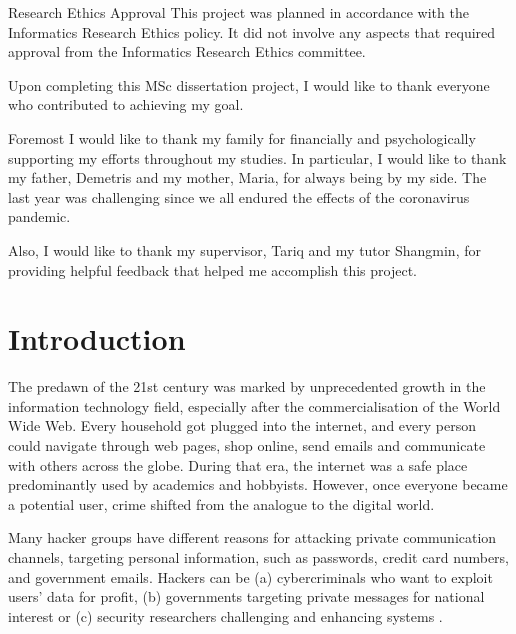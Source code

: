 \documentclass[logo,msc,cyber]{infthesis}   %
\begin{document}
\begin{preliminary}
\newenvironment{ethics}
   {\begin{frontenv}{Research Ethics Approval}{\LARGE}}
   {\end{frontenv}\newpage}

\begin{ethics}
This project was planned in accordance with the Informatics Research
Ethics policy. It did not involve any aspects that required approval
from the Informatics Research Ethics committee.

\standarddeclaration
\end{ethics}


\begin{acknowledgements}
    Upon completing this MSc dissertation project, I would like to thank
    everyone who contributed to achieving my goal.

    Foremost I would like to thank my family for financially and psychologically
    supporting my efforts throughout my studies. In particular, I would like to
    thank my father, Demetris and my mother, Maria, for always being by my side.
    The last year was challenging since we all endured the effects of the
    coronavirus pandemic. 
    
    Also, I would like to thank my supervisor, Tariq and my tutor Shangmin, for
    providing helpful feedback that helped me accomplish this project.
\end{acknowledgements}


\tableofcontents
\end{preliminary}


\chapter{Introduction}

The predawn of the 21st century was marked by unprecedented growth in the
information technology field, especially after the commercialisation of the
World Wide Web. Every household got plugged into the internet, and every person
could navigate through web pages, shop online, send emails and communicate with
others across the globe. During that era, the internet was a safe place
predominantly used by academics and hobbyists. However, once everyone became a
potential user, crime shifted from the analogue to the digital world.

Many hacker groups have different reasons for attacking private communication
channels, targeting personal information, such as passwords, credit card
numbers, and government emails. Hackers can be (a) cybercriminals who want to
exploit users' data for profit, (b) governments targeting private messages for
national interest or (c) security researchers challenging and enhancing systems
\cite{anderson2020security}.
\end{document}
